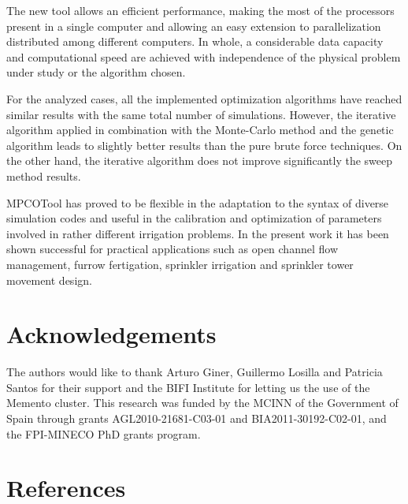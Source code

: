 \documentclass[review,authoryear]{elsarticle}
\begin{document}
The new tool allows an efficient performance, making the most of the processors present in a single computer and allowing an easy extension to parallelization distributed among different computers. In whole, a considerable data capacity and computational speed are achieved with independence of the physical problem under study or the algorithm chosen.

For the analyzed cases, all the implemented optimization algorithms have reached similar results with the same total number of simulations. However, the iterative algorithm applied in combination with the Monte-Carlo method and the genetic algorithm leads to slightly better results than the pure brute force techniques. On the other hand, the iterative algorithm does not improve significantly the sweep method results.

MPCOTool has proved to be flexible in the adaptation to the syntax of diverse simulation codes and useful in the calibration and optimization of parameters involved in rather different irrigation problems. In the present work it has been shown successful for practical applications such as open channel flow management, furrow fertigation, sprinkler irrigation and sprinkler tower movement design.

\section*{Acknowledgements}

The authors would like to thank Arturo Giner, Guillermo Losilla and Patricia
Santos for their support and the BIFI Institute for letting us the use of the
Memento cluster. This research was funded by the MCINN of the Government of
Spain through grants AGL2010-21681-C03-01 and BIA2011-30192-C02-01, and the
FPI-MINECO PhD grants program.

\section*{References}

\end{document}
